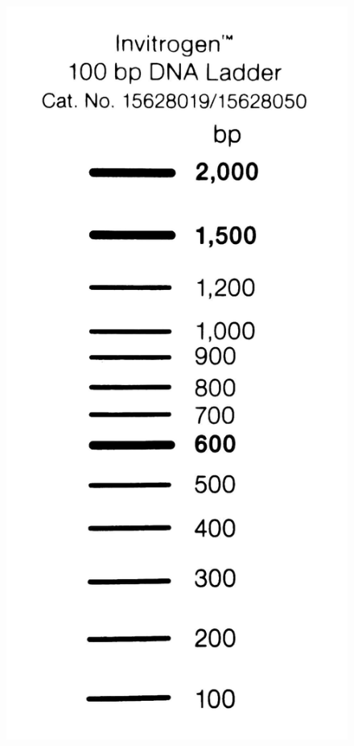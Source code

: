\documentclass[
  letterpaper,
  DIV=11,
  numbers=noendperiod]{scrreprt}
\begin{document}
\begin{figure}
\begin{minipage}[t]{0.50\linewidth}
{{\includegraphics{figures/ladder_100bp_invitrogen.jpeg}

}

}

\end{minipage}%

\end{figure}
\end{document}
